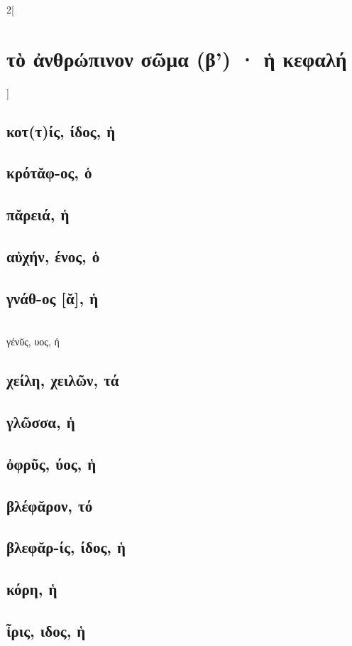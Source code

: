 \documentclass{book}
\begin{document}
\begin{multicols}{2}[\section{τὸ ἀνθρώπινον σῶμα (β') · ἡ κεφαλή}]
\subsection{κοτ(τ)ίς, ίδος, ἡ} 
\subsection{κρότᾰφ-ος, ὁ}        
\subsection{πᾰρειά, ἡ}
\subsection{αὐχήν, ένος, ὁ}
\subsection{γνάθ-ος [ᾰ], ἡ}  ~\\
γένῠς, υος, ἡ 
\subsection{χείλη, χειλῶν, τά}
\subsection{γλῶσσα, ἡ}
\subsection{ὀφρῦς, ύος, ἡ}
\subsection{βλέφᾰρον, τό}
\subsection{βλεφᾰρ-ίς, ίδος, ἡ}
\subsection{κόρη, ἡ}
\subsection{ἶρις, ιδος, ἡ}

\end{multicols}
\end{document}
